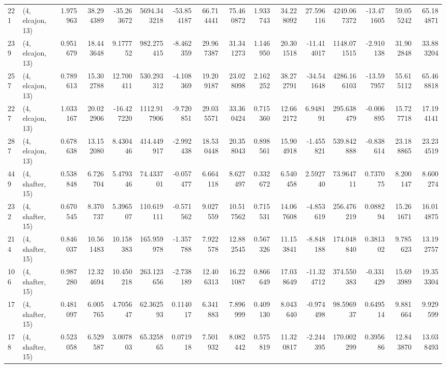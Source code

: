 \begin{tabular}{llrrrrrrrrrrrrrr}
221 &  (4, elcajon, 13) &   1.975963 &  38.294389 & -35.263672 &  5694.343218 & -53.854187 &  66.714441 &  75.460872 &  1.933743 &  34.228092 &  27.596116 &  4249.067372 & -13.471605 &  59.055242 &  65.184871 \\
239 &  (4, elcajon, 13) &   0.951679 &  18.443648 &   9.177752 &   982.275415 &  -8.462359 &  29.967387 &  31.341273 &  1.146950 &  20.301518 & -11.414017 &  1148.071515 &  -2.910138 &  31.902848 &  33.883204 \\
257 &  (4, elcajon, 13) &   0.789613 &  15.302788 &  12.700411 &   530.293312 &  -4.108369 &  19.209187 &  23.028098 &  2.162252 &  38.272791 & -34.541648 &  4286.166103 & -13.597957 &  55.615112 &  65.468818 \\
227 &  (4, elcajon, 13) &   1.033167 &  20.022906 & -16.427220 &  1112.917906 &  -9.720851 &  29.035571 &  33.360424 &  0.715360 &  12.662172 &   6.948191 &   295.638479 &  -0.006895 &  15.727718 &  17.194141 \\
287 &  (4, elcajon, 13) &   0.678638 &  13.152080 &   8.430446 &   414.449917 &  -2.992438 &  18.530448 &  20.358043 &  0.898561 &  15.904918 &  -1.455821 &   539.842888 &  -0.838614 &  23.188865 &  23.234519 \\
449 &  (4, shafter, 15) &   0.538848 &   6.726704 &   5.479346 &    74.433701 &  -0.057477 &   6.664118 &   8.627497 &  0.332672 &   6.540458 &   2.592740 &    73.964711 &   0.737075 &   8.200147 &   8.600274 \\
232 &  (4, shafter, 15) &   0.670545 &   8.370737 &   5.396507 &   110.619111 &  -0.571562 &   9.027559 &  10.517562 &  0.715531 &  14.067608 &  -4.853619 &   256.476219 &   0.088294 &  15.261671 &  16.014875 \\
214 &  (4, shafter, 15) &   0.846037 &  10.561483 &  10.158383 &   165.959978 &  -1.357788 &   7.922578 &  12.882545 &  0.567326 &  11.153841 &  -8.848188 &   174.048840 &   0.381302 &   9.785623 &  13.192757 \\
106 &  (4, shafter, 15) &   0.987280 &  12.324694 &  10.450218 &   263.123656 &  -2.738189 &  12.406313 &  16.221087 &  0.866649 &  17.038649 & -11.324712 &   374.550383 &  -0.331429 &  15.693989 &  19.353304 \\
17  &  (4, shafter, 15) &   0.481097 &   6.005765 &   4.705647 &    62.362593 &   0.114017 &   6.341883 &   7.896999 &  0.409130 &   8.043640 &  -0.974498 &    98.596937 &   0.649514 &   9.881664 &   9.929599 \\
178 &  (4, shafter, 15) &   0.523058 &   6.529587 &   3.007803 &    65.325865 &   0.071918 &   7.501932 &   8.082442 &  0.575819 &  11.320817 &  -2.244395 &   170.002299 &   0.395686 &  12.843870 &  13.038493 \\

\end{tabular}
